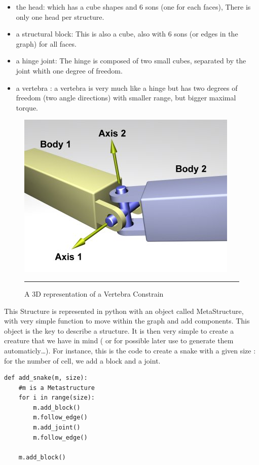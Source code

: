 \begin{itemize}
    \item the head: which has a cube shapes and 6 sons (one for each faces), There is only one head per structure.
    \item a structural block: This is also a cube, also with 6 sons (or edges in the graph) for all faces.
    \item a hinge joint: The hinge is composed of two small cubes, separated by the joint whith one degree of freedom.
    \item a vertebra : a vertebra is very much like a hinge but has two degrees of freedom (two angle directions) with smaller range, but bigger maximal torque.
\end{itemize}

\begin{figure}[htbp]
    \centering
    \includegraphics[scale=2.0]{Figures/vertebra.jpg}
    \rule{35em}{0.5pt}
    \caption[A Vertebra Constraint]{A 3D representation of a Vertebra Constrain}
    \label{fig:Vertebra}
\end{figure}



This Structure is represented in python with an object called MetaStructure, with very simple function to move within the graph and add components. This object is the key to describe a structure. It is then very simple to create a creature that we have in mind ( or for possible later use to generate them automaticly\ldots). For instance, this is the code to create a snake with a given size : for the number of cell, we add a block and a joint. 

\begin{verbatim}
def add_snake(m, size):
    #m is a Metastructure
    for i in range(size):
        m.add_block()
        m.follow_edge()
        m.add_joint()
        m.follow_edge()
    
    m.add_block()
\end{verbatim}


